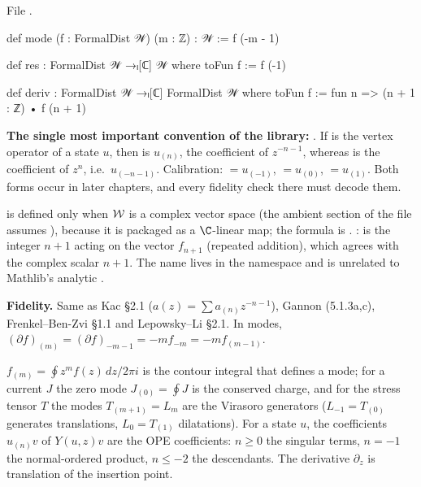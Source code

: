 \noindent File .
\begin{leancode}
def mode (f : FormalDist 𝒲) (m : ℤ) : 𝒲 := f (-m - 1)

def res : FormalDist 𝒲 →ₗ[ℂ] 𝒲 where
  toFun f := f (-1)

def deriv : FormalDist 𝒲 →ₗ[ℂ] FormalDist 𝒲 where
  toFun f := fun n => (n + 1 : ℤ) • f (n + 1)
\end{leancode}

\begin{dictionary}
\textbf{The single most important convention of the library:} . If
 is the vertex operator of a state $u$, then  is
$u_{(n)}$, the coefficient of $z^{-n-1}$, whereas  is the coefficient of $z^n$, i.e.\
$u_{(-n-1)}$. Calibration:  $= u_{(-1)}$,  $= u_{(0)}$,  $= u_{(1)}$.
Both forms occur in later chapters, and every fidelity check there must decode them.

\textbf{} is defined only when $\mathcal{W}$ is a complex vector space (the ambient section of the file
assumes \lean{[AddCommGroup 𝒲] [Module ℂ 𝒲]}), because it is packaged as a $\C$-linear map; the formula is
\lean{f (-1)}. \textbf{\lean{deriv}}: \lean{(n + 1 : ℤ) • f (n + 1)} is the integer $n+1$ acting on the vector
$f_{n+1}$ (repeated addition), which agrees with the complex scalar $n+1$. The name \lean{VOA.deriv} lives in
the namespace \lean{VOA} and is unrelated to Mathlib's analytic \lean{deriv}.

\textbf{Fidelity.} Same as Kac §2.1 ($a(z) = \sum a_{(n)}z^{-n-1}$), Gannon (5.1.3a,c), Frenkel--Ben-Zvi
§1.1 and Lepowsky--Li §2.1. In modes, $(\partial f)_{(m)} = (\partial f)_{-m-1} = -m f_{-m} = -m f_{(m-1)}$.
\end{dictionary}

\begin{physics}
$f_{(m)} = \oint z^mf(z)\,dz/2\pi i$ is the contour integral that defines a mode; for a current $J$ the zero
mode $J_{(0)} = \oint J$ is the conserved charge, and for the stress tensor $T$ the modes $T_{(m+1)} = L_m$ are
the Virasoro generators ($L_{-1} = T_{(0)}$ generates translations, $L_0 = T_{(1)}$ dilatations). For a state
$u$, the coefficients $u_{(n)}v$ of $Y(u,z)v$ are the OPE coefficients: $n\ge0$ the singular terms, $n = -1$
the normal-ordered product, $n\le-2$ the descendants. The derivative $\partial_z$ is translation of the
insertion point.
\end{physics}


